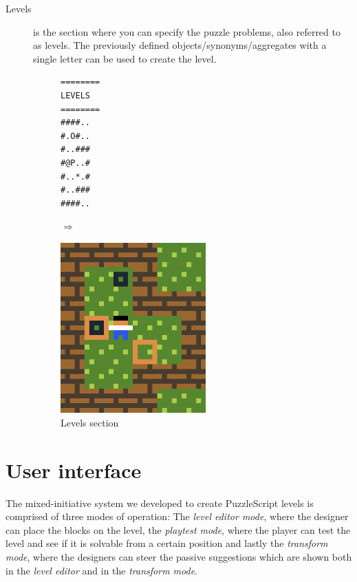 \begin{description}
    \item[Levels] is the section where you can specify the puzzle problems, also referred to as levels.
    The previously defined objects/synonyms/aggregates with a single letter can be used to create the level.
            \begin{figure}[!htbp]
    \begin{minipage}{0.4\textwidth}
        \centering
    \begin{lstlisting}
========
LEVELS
========
####..
#.O#..
#..###
#@P..#
#..*.#
#..###
####..
    \end{lstlisting}
    
    \end{minipage} \qquad $\Longrightarrow$ \hfill
    \begin{minipage}{0.4\textwidth}
        
        \includegraphics[width=0.55\textwidth]{figures/level1.png}
    \end{minipage}
    \caption{Levels section}
    \end{figure}
     
\end{description}


\section{User interface}

The mixed-initiative system we developed to create PuzzleScript levels is comprised of three modes of operation: The \textit{level editor mode}, where the designer can place the blocks on the level, the \textit{playtest mode}, where the player can test the level and see if it is solvable from a certain position and lastly the \textit{transform mode}, where the designers can steer the passive suggestions which are shown both in the \textit{level editor} and in the \textit{transform mode}.

